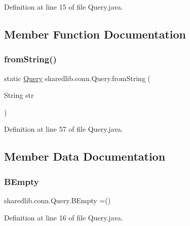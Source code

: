 Definition at line 15 of file Query.\+java.



\subsection{Member Function Documentation}
\hypertarget{enumsharedlib_1_1conn_1_1_query_a1b8a9273d718763c0bc54aae01d26d16}{}\label{enumsharedlib_1_1conn_1_1_query_a1b8a9273d718763c0bc54aae01d26d16} 
\subsubsection{\texorpdfstring{from\+String()}{fromString()}}
{\footnotesize\ttfamily static \hyperlink{enumsharedlib_1_1conn_1_1_query}{Query} sharedlib.\+conn.\+Query.\+from\+String (\begin{DoxyParamCaption}\item[{String}]{str }\end{DoxyParamCaption})\hspace{0.3cm}{\ttfamily [static]}}



Definition at line 57 of file Query.\+java.



\subsection{Member Data Documentation}
\hypertarget{enumsharedlib_1_1conn_1_1_query_a7ac1f270a9ba76e320bf0ce2a88a289f}{}\label{enumsharedlib_1_1conn_1_1_query_a7ac1f270a9ba76e320bf0ce2a88a289f} 
\subsubsection{\texorpdfstring{B\+Empty}{BEmpty}}
{\footnotesize\ttfamily sharedlib.\+conn.\+Query.\+B\+Empty =()}



Definition at line 16 of file Query.\+java.

\hypertarget{enumsharedlib_1_1conn_1_1_query_ac4c7ec95ccd11a96e28a7f8867fb0234}{}\label{enumsharedlib_1_1conn_1_1_query_ac4c7ec95ccd11a96e28a7f8867fb0234} 
